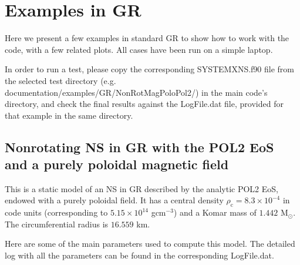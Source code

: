 \documentclass[letterpaper,10pt,english]{sphinxmanual}
\begin{document}
\sphinxstepscope


\chapter{Examples in GR}
\label{\detokenize{examples_gr:examples-in-gr}}\label{\detokenize{examples_gr::doc}}
\sphinxAtStartPar
Here we present a few examples in standard GR to show how to work with
the code, with a few related plots. All cases have been run on a
simple laptop.

\sphinxAtStartPar
In order to run a test, please copy the corresponding SYSTEMXNS.f90
file from the selected test directory
(e.g. documentation/examples/GR/NonRotMagPoloPol2/) in the main code’s
directory, and check the final results against the LogFile.dat file,
provided for that example in the same directory.


\section{Non\sphinxhyphen{}rotating NS in GR with the POL2 EoS and a purely poloidal magnetic field}
\label{\detokenize{examples_gr:non-rotating-ns-in-gr-with-the-pol2-eos-and-a-purely-poloidal-magnetic-field}}
\sphinxAtStartPar
This is a static model of an NS in GR described by the analytic POL2 EoS, endowed with a purely poloidal field. It has a central density \(\rho _\mathrm{c}=8.3\times 10^{-4}\) in code units (corresponding to \(5.15\times 10^{14}\) gcm\(^{-3}\)) and a Komar mass of \(1.442\) M\( _\odot\). The circumferential radius is \(16.559\) km.

\sphinxAtStartPar
Here are some of the main parameters used to compute this model. The detailed log with all the parameters can be found in the corresponding LogFile.dat.
\end{document}
